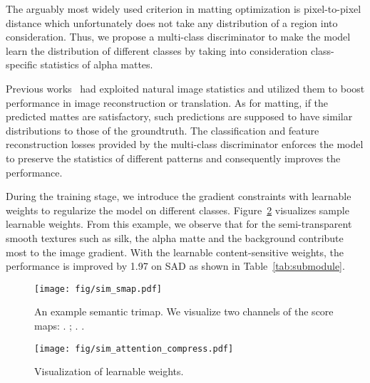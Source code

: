 \documentclass[10pt,twocolumn,letterpaper]{article}
\newcommand\cspace{15}
\newcommand\cspaceadd{2}
\begin{document}
The arguably most widely used criterion in matting optimization is   pixel-to-pixel distance which unfortunately does not take any distribution of a region into consideration. Thus, we propose a  multi-class discriminator to make the model learn the distribution of different classes by taking into consideration class-specific statistics of alpha mattes.

Previous works~\cite{torralba2003statistics, mechrez2018contextual} had exploited natural image statistics and utilized them to boost performance in image reconstruction or translation. As for matting, if the predicted mattes are satisfactory, such predictions are supposed to have similar distributions to those of the groundtruth. The classification and feature reconstruction losses provided by the multi-class discriminator enforces the model to preserve the statistics of different patterns and consequently improves the performance. 




\vspace{\cspaceadd pt}
\vspace{4pt}
During the training stage, we introduce the gradient constraints with learnable weights to regularize the model on different classes.  Figure~\ref{fig:attention} visualizes sample learnable weights. From this example, we observe that for the semi-transparent smooth textures such as silk, the alpha matte and the background contribute most to the image gradient. 
With the learnable content-sensitive weights, the performance is improved by 1.97 on SAD as shown in Table~\ref{tab:submodule}.


\begin{figure}[t]
\centering 
\texttt{[image: fig/sim\_smap.pdf]} 
\caption{An example semantic trimap. We visualize two channels of the score maps: . ; . .}
\label{fig:smap}
\vspace{-4pt}
\end{figure}

\begin{figure}[t]
\centering 
\texttt{[image: fig/sim\_attention\_compress.pdf]} 
\caption{Visualization of learnable weights.} 
\label{fig:attention}
\vspace{-\cspace pt}
\end{figure}
\end{document}
